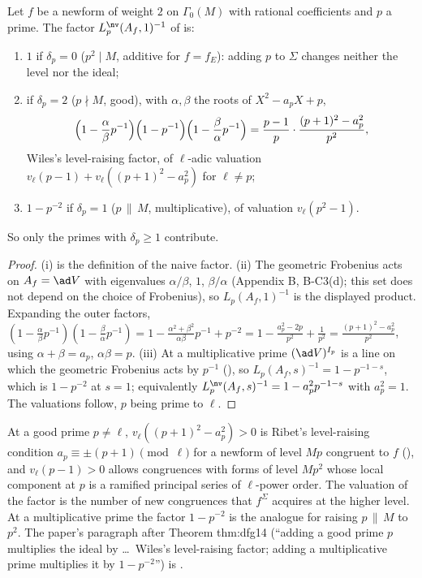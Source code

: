 \begin{proposition}\label{prop:congruence:three-cases}
Let $f$ be a newform of weight $2$ on $\Gamma_0(M)$ with rational coefficients and $p$ a prime. The factor $L^{\nv}_p(A_f,1)^{-1}$ of  is:
\begin{enumerate}[label=(\roman*)]
\item $1$ if $\delta_p=0$ ($p^2\mid M$, additive for $f=f_E$): adding $p$ to $\Sigma$ changes neither the level nor the ideal;
\item if $\delta_p=2$ ($p\nmid M$, good), with $\alpha,\beta$ the roots of $X^2-a_pX+p$,
\[
\Bigl(1-\frac\alpha\beta p^{-1}\Bigr)\Bigl(1-p^{-1}\Bigr)\Bigl(1-\frac\beta\alpha p^{-1}\Bigr)=\frac{p-1}p\cdot\frac{(p+1)^2-a_p^2}{p^2},
\]
Wiles's level-raising factor, of $\ell$-adic valuation $v_\ell(p-1)+v_\ell((p+1)^2-a_p^2)$ for $\ell\ne p$;
\item $1-p^{-2}$ if $\delta_p=1$ ($p\,\|\,M$, multiplicative), of valuation $v_\ell(p^2-1)$.
\end{enumerate}
So only the primes with $\delta_p\ge1$ contribute.
\end{proposition}

\begin{proof}
(i) is the definition of the naive factor. (ii) The geometric Frobenius acts on $A_f=\ad V$ with eigenvalues $\alpha/\beta$, $1$, $\beta/\alpha$ (Appendix B, B-C3(d); this set does not depend on the choice of
Frobenius), so $L_p(A_f,1)^{-1}$ is the displayed product. Expanding the outer factors, $(1-\frac\alpha\beta p^{-1})(1-\frac\beta\alpha p^{-1})=1-\frac{\alpha^2+\beta^2}{\alpha\beta}p^{-1}+p^{-2}=1-\frac{a_p^2-2p}{p^2}+\frac1{p^2}=\frac{(p+1)^2-a_p^2}{p^2}$,
using $\alpha+\beta=a_p$, $\alpha\beta=p$. (iii) At a multiplicative prime $(\ad V)^{I_p}$ is a line on which the geometric Frobenius acts by $p^{-1}$ (), so $L_p(A_f,s)^{-1}=1-p^{-1-s}$, which is
$1-p^{-2}$ at $s=1$; equivalently $L^{\nv}_p(A_f,s)^{-1}=1-a_p^2p^{-1-s}$ with $a_p^2=1$. The valuations follow, $p$ being prime to $\ell$.
\end{proof}

\begin{remark}\label{rem:congruence:factors-count}
At a good prime $p\ne\ell$, $v_\ell((p+1)^2-a_p^2)>0$ is Ribet's level-raising condition $a_p\equiv\pm(p+1)\pmod\ell$ for a newform of level $Mp$ congruent to $f$ (), and
$v_\ell(p-1)>0$ allows congruences with forms of level $Mp^2$ whose local component at $p$ is a ramified principal series of $\ell$-power order. The valuation of the factor is the
number of new congruences that $f^\Sigma$ acquires at the higher level. At a multiplicative prime the factor $1-p^{-2}$ is the analogue for raising $p\,\|\,M$ to $p^2$. The paper's
paragraph after Theorem thm:dfg14 (``adding a good prime $p$ multiplies the ideal by \dots\ Wiles's level-raising factor; adding a multiplicative prime multiplies it by $1-p^{-2}$'') is
.
\end{remark}


